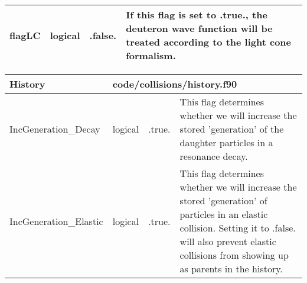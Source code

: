 \documentclass{article}
\begin{document}
\begin{longtable}{llll}
\midrule
flagLC & \begin{minipage}[t]{2cm}logical\end{minipage} & \begin{minipage}[t]{2cm}.false.\end{minipage} & \begin{minipage}[t]{12cm}If this flag is set to .true., the deuteron wave function will be treated according to the light cone formalism.\end{minipage}\\*
\bottomrule
\end{longtable}
{ }




\begin{longtable}{llll}
\toprule
\textbf{\large{History}} & \multicolumn{3}{l}{\footnotesize{code/collisions/history.f90}}\\*
\midrule
\endfirsthead
\midrule
\endhead
IncGeneration\_Decay & \begin{minipage}[t]{2cm}logical\end{minipage} & \begin{minipage}[t]{2cm}.true.\end{minipage} & \begin{minipage}[t]{12cm}This flag determines whether we will increase the stored 'generation' of the daughter particles in a resonance decay.\end{minipage}\\*
\midrule
IncGeneration\_Elastic & \begin{minipage}[t]{2cm}logical\end{minipage} & \begin{minipage}[t]{2cm}.true.\end{minipage} & \begin{minipage}[t]{12cm}This flag determines whether we will increase the stored 'generation' of particles in an elastic collision. Setting it to .false. will also prevent elastic collisions from showing up as parents in the history.\end{minipage}\\*
\bottomrule
\end{longtable}
{ }



\end{document}
